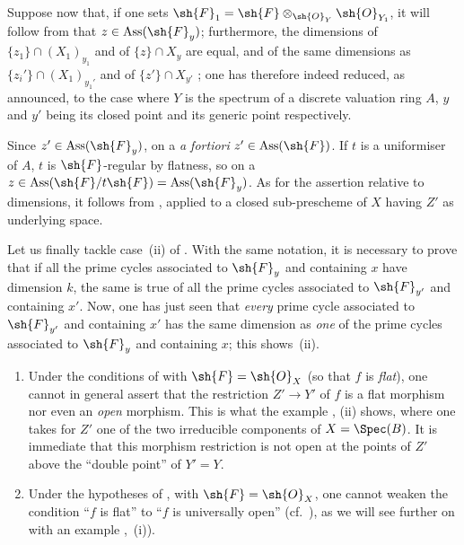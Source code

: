 \begin{env}[12.1.1.4]
Suppose now that, if one sets $\sh{F}_1=\sh{F}\otimes_{\sh{O}_Y}\sh{O}_{Y_1}$, it will follow from  that $z\in\operatorname{Ass}(\sh{F}_y)$; furthermore, the dimensions of $\{z_1\}\cap(X_1)_{y_1}$ and of $\{z\}\cap X_y$ are equal, and of the same dimensions as $\{z_i'\}\cap(X_1)_{y_1'}$ and of $\{z'\}\cap X_{y'}$ ; one has therefore indeed reduced, as announced, to the case where $Y$ is the spectrum of a discrete valuation ring $A$, $y$ and $y'$ being its closed point and its generic point respectively.

Since $z'\in\operatorname{Ass}(\sh{F}_y)$, on a \emph{a fortiori} $z'\in\operatorname{Ass}(\sh{F})$.
If $t$ is a uniformiser of $A$, $t$ is $\sh{F}$-regular by flatness, so  on a $z\in\operatorname{Ass}(\sh{F}/t\sh{F})=\operatorname{Ass}(\sh{F}_y)$.
As for the assertion relative to dimensions, it follows from , applied to a closed sub-prescheme of $X$ having $Z'$ as underlying space.

Let us finally tackle case~(ii) of .
With the same notation, it is necessary to prove that if all the prime cycles associated to $\sh{F}_y$ and containing $x$ have dimension $k$, the same is true of all the prime cycles associated to $\sh{F}_{y'}$ and containing $x'$.
Now, one has just seen that \emph{every} prime cycle associated to $\sh{F}_{y'}$ and containing $x'$ has the same dimension as \emph{one} of the prime cycles associated to $\sh{F}_y$ and containing $x$; this shows~(ii).
\end{env}

\begin{remarks}[12.1.2]
\label{IV.12.1.2}
\begin{enumerate}[label=(\roman*)]
  \item Under the conditions of  with $\sh{F}=\sh{O}_X$ (so that $f$ is \emph{flat}), one cannot in general assert that the restriction $Z'\to Y'$ of $f$ is a flat morphism nor even an \emph{open} morphism.
This is what the example ,
(ii) shows, where one takes for $Z'$ one of the two irreducible components of $X=\Spec(B)$.
It is immediate that this morphism restriction is not open at the points of $Z'$ above the ``double point'' of $Y'=Y$.

  \item Under the hypotheses of , with $\sh{F}=\sh{O}_X$, one cannot weaken the condition ``$f$ is flat'' to ``$f$ is universally open'' (cf.\ ), as we will see further on with an example ,~(i)).
\end{enumerate}
\end{remarks}

